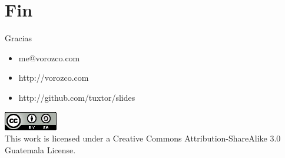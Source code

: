 \documentclass{beamer}
\begin{document}
\section{Fin}

\begin{frame}{Gracias}
\begin{itemize}
\item me@vorozco.com
\item http://vorozco.com
\item http://github.com/tuxtor/slides
\end{itemize}
\begin{center}
\includegraphics[width=0.1\linewidth]{Images/cclogo}
\\
This work is licensed under a Creative Commons Attribution-ShareAlike 3.0 Guatemala License.
\end{center}
\end{frame}
\end{document}

